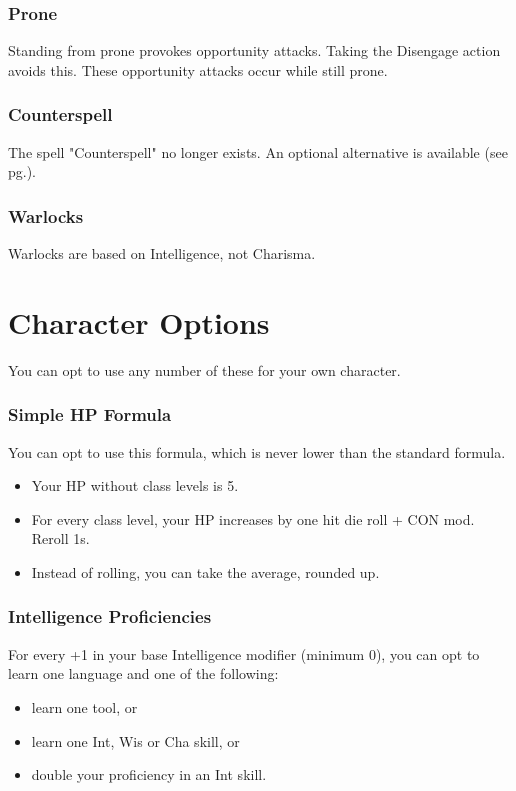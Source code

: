 \documentclass[letterpaper,twocolumn,openany,nodeprecatedcode]{dndbook}
\newcommand{\pg}[1]{pg.\pageref{#1}}
\newcommand{\see}[1]{(see \pg{#1})}
\begin{document}
\subsection{Prone}
Standing from prone provokes opportunity attacks. Taking the Disengage action avoids this.
These opportunity attacks occur while still prone.

\subsection{Counterspell}
The spell "Counterspell" no longer exists. An optional alternative is available \see{counterspell}.

\subsection{Warlocks}
Warlocks are based on Intelligence, not Charisma.










\chapter{Character Options}
You can opt to use any number of these for your own character.

\subsection{Simple HP Formula}
You can opt to use this formula, which is never lower than the standard formula.
\begin{itemize}
\item Your HP without class levels is 5.
\item For every class level, your HP increases by one hit die roll + CON mod. Reroll 1s. 
\item Instead of rolling, you can take the average, rounded up.
\end{itemize}

\subsection{Intelligence Proficiencies}
For every +1 in your base Intelligence modifier (minimum 0), you can opt to learn one language and one of the following:
\begin{itemize}
    \item learn one tool, or
    \item learn one Int, Wis or Cha skill, or
    \item double your proficiency in an Int skill.
\end{itemize}
\end{document}
